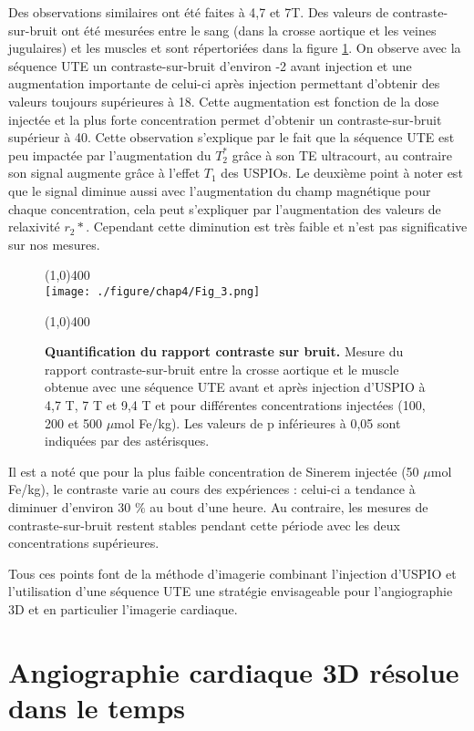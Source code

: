 Des observations similaires ont été faites à 4,7 et 7T. Des valeurs de contraste-sur-bruit ont été mesurées entre le sang (dans la crosse aortique et les veines jugulaires) et les muscles et sont répertoriées dans la figure \ref{fig:contraste-sur-bruitUteFlash}. On observe avec la séquence UTE un contraste-sur-bruit d'environ -2 avant injection et une augmentation importante de celui-ci après injection permettant d'obtenir des valeurs toujours supérieures à 18. Cette augmentation est fonction de la dose injectée et la plus forte concentration permet d'obtenir un contraste-sur-bruit supérieur à 40. Cette observation s'explique par le fait que la séquence UTE est peu impactée par l'augmentation du $T_2^*$ grâce à son TE ultracourt, au contraire son signal augmente grâce à l'effet $T_1$ des USPIOs.
Le deuxième point à noter est que le signal diminue aussi avec l'augmentation du champ magnétique pour chaque concentration, cela peut s'expliquer par l'augmentation des valeurs de relaxivité $r_2*$. Cependant cette diminution est très faible et n'est pas significative sur nos mesures.

\begin{figure}[H]
\centering
\line(1,0){400} \\
\texttt{[image: ./figure/chap4/Fig\_3.png]}
\caption[Quantification du rapport contraste sur bruit.]{\label{fig:contraste-sur-bruitUteFlash} \textbf{Quantification du rapport contraste sur bruit.} Mesure du rapport contraste-sur-bruit entre la crosse aortique et le muscle obtenue avec une séquence UTE avant et après injection d'USPIO à 4,7 T, 7 T et 9,4 T et pour différentes concentrations injectées (100, 200 et 500 $\mu$mol Fe/kg). Les valeurs de p inférieures à 0,05 sont indiquées par des astérisques.}
\line(1,0){400} \\ 
\end{figure}

Il est a noté que pour la plus faible concentration de Sinerem injectée (50 $\mu$mol Fe/kg), le contraste varie au cours des expériences : celui-ci a tendance à diminuer d'environ 30 $\%$ au bout d'une heure. Au contraire, les mesures de contraste-sur-bruit restent stables pendant cette période avec les deux concentrations supérieures. 

Tous ces points font de la méthode d'imagerie combinant l'injection d'USPIO et l'utilisation d'une séquence UTE une stratégie envisageable pour l'angiographie 3D et en particulier l'imagerie cardiaque.

\section{Angiographie cardiaque 3D résolue dans le temps}

